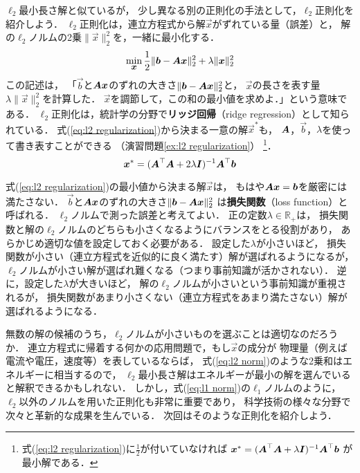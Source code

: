 $\ell_2$最小長さ解と似ているが，
少し異なる別の正則化の手法として，$\ell_2$正則化を紹介しよう．
$\ell_2$正則化は，連立方程式から解$\vec x$がずれている量（誤差）と，
解の$\ell_2$ノルムの2乗$\|\vec x\|_2^2$を，一緒に最小化する．
\begin{equation}
 \min_{\small\mbox{\boldmath $x$}} \frac{1}{2}\|\mbox{\boldmath $b$}-\mbox{\boldmath $A$}\mbox{\boldmath $x$}\|_2^2
+\lambda \|\mbox{\boldmath $x$}\|_2^2
\label{eq:l2 regularization}
\end{equation}
この記述は，
「$\vec b$と$\mbox{\boldmath $A$}\mbox{\boldmath $x$}$のずれの大きさ$\|\mbox{\boldmath $b$}-\mbox{\boldmath $A$}\mbox{\boldmath $x$}\|_2^2$と，
$\vec x$の長さを表す量$\lambda\|\vec x\|_2^2$を計算した．
$\vec x$を調節して，この和の最小値を求めよ．」という意味である．
$\ell_2$正則化は，統計学の分野で{\bf リッジ回帰}（ridge regression）として知られている．
式(\ref{eq:l2 regularization})から決まる一意の解$\vec x^*$も，
$\mbox{\boldmath $A$}$，$\vec b$，$\lambda$を使って書き表すことができる
（演習問題\ref{ex:l2 regularization}）%
\footnote{式(\ref{eq:l2 regularization})に$\frac{1}{2}$が付いていなければ
$\mbox{\boldmath $x$}^*=(\mbox{\boldmath $A$}^\top\mbox{\boldmath $A$}+\lambda\mbox{\boldmath $I$})^{-1}\mbox{\boldmath $A$}^\top\mbox{\boldmath $b$}$
が最小解である．}．
\begin{equation}
\mbox{\boldmath $x$}^*=(\mbox{\boldmath $A$}^\top\mbox{\boldmath $A$}+2\lambda\mbox{\boldmath $I$})^{-1}\mbox{\boldmath $A$}^\top\mbox{\boldmath $b$}
\label{eq:l2 ridge}
\end{equation}


式(\ref{eq:l2 regularization})の最小値から決まる解$\vec x$は，
もはや$\mbox{\boldmath $A$}\mbox{\boldmath $x$}=\mbox{\boldmath $b$}$を厳密には満たさない．
$\vec b$と$\mbox{\boldmath $A$}\mbox{\boldmath $x$}$のずれの大きさ$\|\mbox{\boldmath $b$}-\mbox{\boldmath $A$}\mbox{\boldmath $x$}\|_2^2$
は{\bf 損失関数}（loss function）と呼ばれる．
$\ell_2$ノルムで測った誤差と考えてよい．
正の定数$\lambda\in\mathbb{R}_+$は，
損失関数と解の$\ell_2$ノルムのどちらも小さくなるようにバランスをとる役割があり，
あらかじめ適切な値を設定しておく必要がある．
設定した$\lambda$が小さいほど，
損失関数が小さい（連立方程式を近似的に良く満たす）解が選ばれるようになるが，
$\ell_2$ノルムが小さい解が選ばれ難くなる（つまり事前知識が活かされない）．
逆に，設定した$\lambda$が大きいほど，
解の$\ell_2$ノルムが小さいという事前知識が重視されるが，
損失関数があまり小さくない（連立方程式をあまり満たさない）解が選ばれるようになる．


無数の解の候補のうち，$\ell_2$ノルムが小さいものを選ぶことは適切なのだろうか．
連立方程式に帰着する何かの応用問題で，もし$\vec x$の成分が
物理量（例えば電流や電圧，速度等）を表しているならば，
式(\ref{eq:l2 norm})のような2乗和はエネルギーに相当するので，
$\ell_2$最小長さ解はエネルギーが最小の解を選んでいると解釈できるかもしれない．
しかし，式(\ref{eq:l1 norm})の$\ell_1$ノルムのように，
$\ell_2$以外のノルムを用いた正則化も非常に重要であり，
科学技術の様々な分野で次々と革新的な成果を生んでいる．
次回はそのような正則化を紹介しよう．




